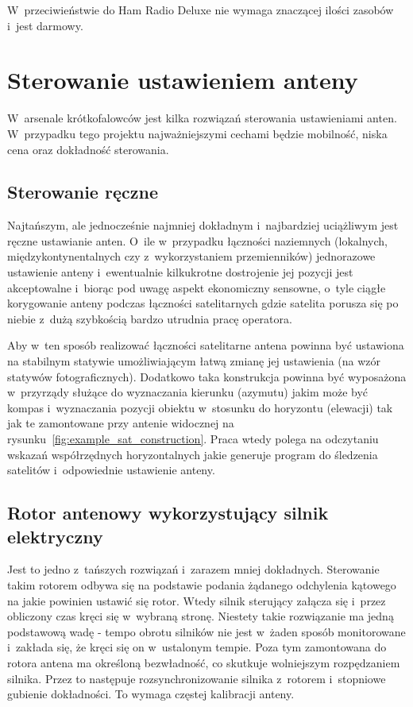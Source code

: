 \documentclass[eng,oneside]{mgr}
\begin{document}
			W~przeciwieństwie do Ham Radio Deluxe nie wymaga znaczącej ilości zasobów i~jest darmowy.

		\section{Sterowanie ustawieniem anteny}
		W~arsenale krótkofalowców jest kilka rozwiązań sterowania ustawieniami anten. W~przypadku tego projektu najważniejszymi cechami będzie mobilność, niska cena oraz dokładność sterowania.

			\subsection{Sterowanie ręczne}
			Najtańszym, ale jednocześnie najmniej dokładnym i~najbardziej uciążliwym jest ręczne ustawianie anten. O~ile w~przypadku łączności naziemnych (lokalnych, międzykontynentalnych czy z~wykorzystaniem przemienników) jednorazowe ustawienie anteny i~ewentualnie kilkukrotne dostrojenie jej pozycji jest akceptowalne i~biorąc pod uwagę aspekt ekonomiczny sensowne, o~tyle ciągłe korygowanie anteny podczas łączności satelitarnych gdzie satelita porusza się po niebie z~dużą szybkością bardzo utrudnia pracę operatora.

			Aby w~ten sposób realizować łączności satelitarne antena powinna być ustawiona na stabilnym statywie umożliwiającym łatwą zmianę jej ustawienia (na wzór statywów fotograficznych). Dodatkowo taka konstrukcja powinna być wyposażona w~przyrządy służące do wyznaczania kierunku (azymutu) jakim może być kompas i~wyznaczania pozycji obiektu w~stosunku do horyzontu (elewacji) tak jak te zamontowane przy antenie widocznej na rysunku~\ref{fig:example_sat_construction}. Praca wtedy polega na odczytaniu wskazań współrzędnych horyzontalnych jakie generuje program do śledzenia satelitów i~odpowiednie ustawienie anteny.

			\subsection{Rotor antenowy wykorzystujący silnik elektryczny}
			Jest to jedno z~tańszych rozwiązań i~zarazem mniej dokładnych. Sterowanie takim rotorem odbywa się na podstawie podania żądanego odchylenia kątowego na jakie powinien ustawić się rotor. Wtedy silnik sterujący załącza się i~przez obliczony czas kręci się w~wybraną stronę. Niestety takie rozwiązanie ma jedną podstawową wadę - tempo obrotu silników nie jest w~żaden sposób monitorowane i~zakłada się, że kręci się on w~ustalonym tempie. Poza tym zamontowana do rotora antena ma określoną bezwładność, co skutkuje wolniejszym rozpędzaniem silnika. Przez to następuje rozsynchronizowanie silnika z~rotorem i~stopniowe gubienie dokładności. To wymaga częstej kalibracji anteny.
\end{document}

